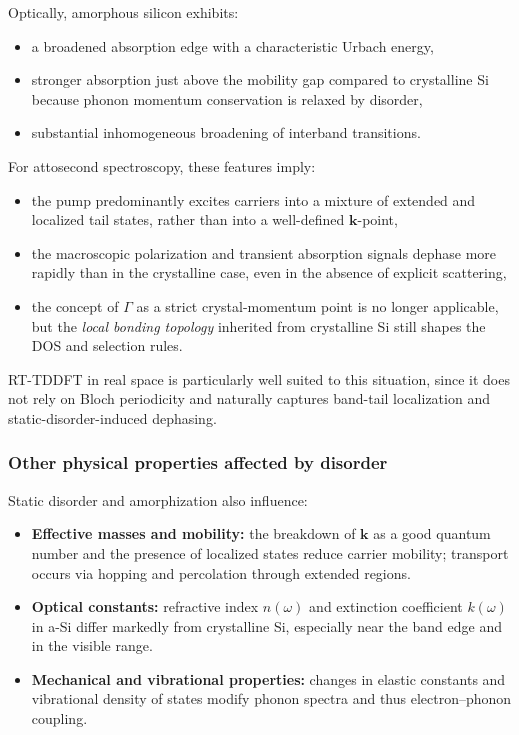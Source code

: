 Optically, amorphous silicon exhibits:
\begin{itemize}
  \item a broadened absorption edge with a characteristic Urbach energy,
  \item stronger absorption just above the mobility gap compared to crystalline Si because phonon momentum conservation is relaxed by disorder,\cite{Robertson1983,Robertson1983Review}
  \item substantial inhomogeneous broadening of interband transitions.
\end{itemize}

For attosecond spectroscopy, these features imply:
\begin{itemize}
  \item the pump predominantly excites carriers into a mixture of extended and localized tail states, rather than into a well-defined $\mathbf k$-point,
  \item the macroscopic polarization and transient absorption signals dephase more rapidly than in the crystalline case, even in the absence of explicit scattering,
  \item the concept of $\Gamma$ as a strict crystal-momentum point is no longer applicable, but the \emph{local bonding topology} inherited from crystalline Si still shapes the DOS and selection rules.
\end{itemize}
RT-TDDFT in real space is particularly well suited to this situation, since it does not rely on Bloch periodicity and naturally captures band-tail localization and static-disorder-induced dephasing.\cite{Bondi2010,Drabold1999,Dnaya2024,AttaFynn2004}

\subsubsection{Other physical properties affected by disorder}

Static disorder and amorphization also influence:
\begin{itemize}
  \item \textbf{Effective masses and mobility:} the breakdown of $\mathbf k$ as a good quantum number and the presence of localized states reduce carrier mobility; transport occurs via hopping and percolation through extended regions.\cite{Drabold1999,AttaFynn2004}
  \item \textbf{Optical constants:} refractive index $n(\omega)$ and extinction coefficient $k(\omega)$ in a-Si differ markedly from crystalline Si, especially near the band edge and in the visible range.\cite{OpticalPropsASi}
  \item \textbf{Mechanical and vibrational properties:} changes in elastic constants and vibrational density of states modify phonon spectra and thus electron--phonon coupling.\cite{Bondi2010,Zhou2023}
\end{itemize}

